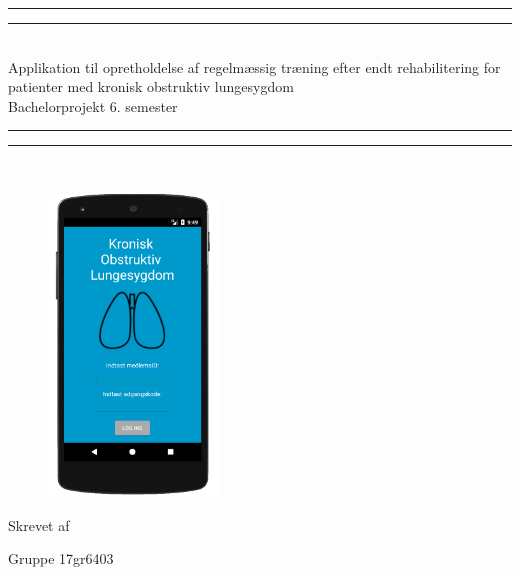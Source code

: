\begin{center}
\vspace*{\baselineskip}
\rule{\textwidth}{1.6pt}\vspace*{-\baselineskip}\vspace*{2pt} %
\rule{\textwidth}{0.4pt}\\[\baselineskip] %

{\huge Applikation til opretholdelse af regelmæssig træning efter endt rehabilitering for patienter med kronisk obstruktiv lungesygdom\\[0.4\baselineskip] \LARGE Bachelorprojekt 6. semester}\\[0.2\baselineskip] %

\rule{\textwidth}{0.4pt}\vspace*{-\baselineskip}\vspace{3.2pt} %
\rule{\textwidth}{1.6pt}\\[\baselineskip] %
\vspace*{1\baselineskip}




\begin{figure} [H]
\centering
\includegraphics[width=0.4\textwidth]{figures/test/KOLKOLforside}
\label{fig:aktivitetsdiagram}
\end{figure}
Skrevet af \\
{\Large Gruppe 17gr6403\par}
\end{center} %

